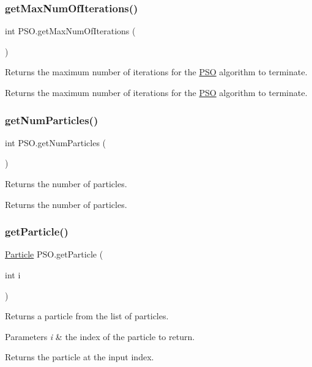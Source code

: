 \subsubsection{\texorpdfstring{get\+Max\+Num\+Of\+Iterations()}{getMaxNumOfIterations()}}
{\footnotesize\ttfamily int P\+S\+O.\+get\+Max\+Num\+Of\+Iterations (\begin{DoxyParamCaption}{ }\end{DoxyParamCaption})}

Returns the maximum number of iterations for the \hyperlink{class_p_s_o}{P\+SO} algorithm to terminate. \begin{DoxyReturn}{Returns}
the maximum number of iterations for the \hyperlink{class_p_s_o}{P\+SO} algorithm to terminate. 
\end{DoxyReturn}
\mbox{\label{class_p_s_o_acc2a16aac995a30f3265fa06182509af}} 
\subsubsection{\texorpdfstring{get\+Num\+Particles()}{getNumParticles()}}
{\footnotesize\ttfamily int P\+S\+O.\+get\+Num\+Particles (\begin{DoxyParamCaption}{ }\end{DoxyParamCaption})}

Returns the number of particles. \begin{DoxyReturn}{Returns}
the number of particles. 
\end{DoxyReturn}
\mbox{\label{class_p_s_o_a3c697a11238d768ae2b1236d3cf6ea88}} 
\subsubsection{\texorpdfstring{get\+Particle()}{getParticle()}}
{\footnotesize\ttfamily \hyperlink{class_particle}{Particle} P\+S\+O.\+get\+Particle (\begin{DoxyParamCaption}\item[{int}]{i }\end{DoxyParamCaption})}

Returns a particle from the list of particles. 
\begin{DoxyParams}{Parameters}
{\em i} & the index of the particle to return. \\
\hline
\end{DoxyParams}
\begin{DoxyReturn}{Returns}
the particle at the input index. 
\end{DoxyReturn}
\mbox{\label{class_p_s_o_a46ddfeb9df3a42b2f1b2c4fe0d8f51b2}} 
